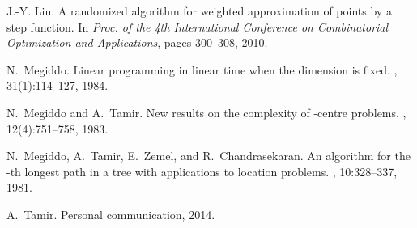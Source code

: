 \documentclass{llncs}
\begin{document}
\begin{thebibliography}{10}
J.-Y. Liu.
\newblock A randomized algorithm for weighted approximation of points by a step
  function.
\newblock In {\em Proc. of the 4th International Conference on Combinatorial
  Optimization and Applications}, pages 300--308, 2010.

N.~Megiddo.
\newblock Linear programming in linear time when the dimension is fixed.
, 31(1):114--127, 1984.

N.~Megiddo and A.~Tamir.
\newblock New results on the complexity of -centre problems.
, 12(4):751--758, 1983.

N.~Megiddo, A.~Tamir, E.~Zemel, and R.~Chandrasekaran.
\newblock An {} algorithm for the -th longest path in a tree
  with applications to location problems.
, 10:328--337, 1981.

A.~Tamir.
\newblock Personal communication, 2014.

\end{thebibliography}
\end{document}

